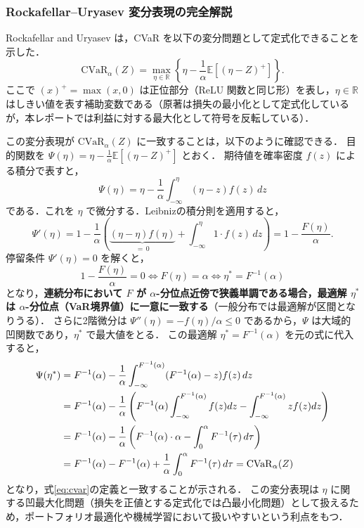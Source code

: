 \documentclass[a4paper,10pt]{jsarticle}
\theoremstyle{definition}
\newcommand{\CVaR}{\mathrm{CVaR}}
\renewcommand{\Finv}{F^{-1}}
\newcommand{\R}{\mathbb{R}}
\newcommand{\E}{\mathbb{E}}
\begin{document}
\subsubsection{Rockafellar--Uryasev 変分表現の完全解説}
Rockafellar and Uryasev \cite{rockafellar2000cvar} は，CVaR を以下の変分問題として定式化できることを示した．
\begin{equation}
  \CVaR_\alpha(Z) = \max_{\eta\in\R}\left\{\eta - \frac{1}{\alpha}\E\left[(\eta - Z)^+\right]\right\}.
  \label{eq:ru-cvar}
\end{equation}
ここで $(x)^+ = \max(x, 0)$ は正位部分（ReLU 関数と同じ形）を表し，$\eta \in \R$ はしきい値を表す補助変数である（原著は損失の最小化として定式化しているが，本レポートでは利益に対する最大化として符号を反転している）．

この変分表現が $\CVaR_\alpha(Z)$ に一致することは，以下のように確認できる．
目的関数を $\Psi(\eta) = \eta - \frac{1}{\alpha}\E[(\eta - Z)^+]$ とおく．
期待値を確率密度 $f(z)$ による積分で表すと，
\begin{equation}
  \Psi(\eta) = \eta - \frac{1}{\alpha}\int_{-\infty}^\eta (\eta - z) f(z)\,dz
\end{equation}
である．これを $\eta$ で微分する．Leibnizの積分則を適用すると，
\begin{equation}
  \Psi'(\eta) = 1 - \frac{1}{\alpha}\left( \underbrace{(\eta - \eta)f(\eta)}_{=\,0} + \int_{-\infty}^\eta 1\cdot f(z)\,dz \right) = 1 - \frac{F(\eta)}{\alpha}.
\end{equation}
停留条件 $\Psi'(\eta) = 0$ を解くと，
\begin{equation}
  1 - \frac{F(\eta)}{\alpha} = 0 \iff F(\eta) = \alpha \iff \eta^* = \Finv(\alpha)
\end{equation}
となり，\textbf{連続分布において $F$ が $\alpha$-分位点近傍で狭義単調である場合，最適解 $\eta^*$ は $\alpha$-分位点（VaR境界値）に一意に一致する}（一般分布では最適解が区間となりうる）．
さらに2階微分は $\Psi''(\eta) = -f(\eta)/\alpha \le 0$ であるから，$\Psi$ は大域的凹関数であり，$\eta^*$ で最大値をとる．
この最適解 $\eta^* = \Finv(\alpha)$ を元の式に代入すると，
\begin{align}
  \Psi(\eta^*)
  &= \Finv(\alpha) - \frac{1}{\alpha}\int_{-\infty}^{\Finv(\alpha)} (\Finv(\alpha) - z) f(z)\,dz \notag\\
  &= \Finv(\alpha) - \frac{1}{\alpha}\left( \Finv(\alpha)\int_{-\infty}^{\Finv(\alpha)} f(z)dz - \int_{-\infty}^{\Finv(\alpha)} z f(z)dz \right) \notag\\
  &= \Finv(\alpha) - \frac{1}{\alpha}\left( \Finv(\alpha)\cdot\alpha - \int_0^\alpha \Finv(\tau)\,d\tau \right) \notag\\
  &= \Finv(\alpha) - \Finv(\alpha) + \frac{1}{\alpha}\int_0^\alpha \Finv(\tau)\,d\tau = \CVaR_\alpha(Z)
\end{align}
となり，式\eqref{eq:cvar}の定義と一致することが示される．
この変分表現は $\eta$ に関する凹最大化問題（損失を正値とする定式化では凸最小化問題）として扱えるため，ポートフォリオ最適化や機械学習において扱いやすいという利点をもつ．
\end{document}
